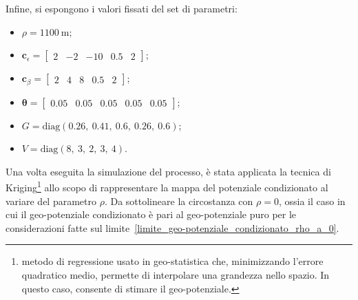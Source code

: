 Infine, si espongono i valori fissati del set di parametri:
\begin{itemize}
	\item $\rho = \SI{1100}{\meter}$;
	\item $\mathbf{c}_\epsilon = \begin{bmatrix} 2 & -2 & -10 & 0.5 & 2 \end{bmatrix}$;
	\item $\mathbf{c}_\beta = \begin{bmatrix} 2 & 4 & 8 & 0.5 & 2 \end{bmatrix}$;
	\item $\boldsymbol{\theta} = \begin{bmatrix} 0.05 & 0.05  & 0.05 & 0.05  & 0.05  \end{bmatrix}$;
	\item $G = \text{diag}(0.26,\ 0.41,\ 0.6,\ 0.26,\ 0.6)$;
	\item $V = \text{diag}(8,\ 3,\ 2,\ 3,\ 4)$.
\end{itemize}
Una volta eseguita la simulazione del processo, è stata applicata la tecnica di Kriging\footnote{metodo di regressione usato in geo-statistica che, minimizzando l'errore quadratico medio, permette di interpolare una grandezza nello spazio. In questo caso, consente di stimare il geo-potenziale.} allo scopo di rappresentare la mappa del potenziale condizionato al variare del parametro $\rho$. Da sottolineare la circostanza con $\rho = 0$, ossia il caso in cui il geo-potenziale condizionato è pari al geo-potenziale puro per le considerazioni fatte sul limite~\ref{limite_geo-potenziale_condizionato_rho_a_0}.

